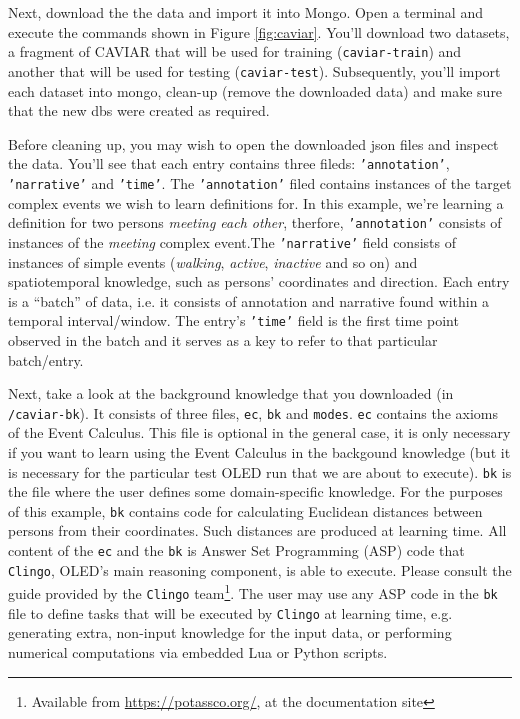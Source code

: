 \documentclass[12pt]{article}
\begin{document}
Next, download the the data and import it into Mongo. Open a terminal and execute the commands shown in Figure \ref{fig:caviar}. You'll download two datasets, a fragment of CAVIAR that will be used for training (\texttt{caviar-train}) and another that will be used for testing (\texttt{caviar-test}). Subsequently, you'll import each dataset into mongo, clean-up (remove the downloaded data) and make sure that the new dbs were created as required. 

Before cleaning up, you may wish to open the downloaded json files and inspect the data. You'll see that each entry contains three fileds: \texttt{'annotation'}, \texttt{'narrative'} and \texttt{'time'}. The \texttt{'annotation'} filed contains instances of the target complex events we wish to learn definitions for. In this example, we're learning a definition for two persons \emph{meeting each other}, therfore, \texttt{'annotation'} consists of instances of the \emph{meeting} complex event.\linebreak The \texttt{'narrative'} field consists of instances of simple events (\emph{walking}, \emph{active}, \emph{inactive} and so on) and spatiotemporal knowledge, such as persons' coordinates and direction. Each entry is a ``batch'' of data, i.e. it consists of annotation and narrative found within a temporal interval/window. The entry's \texttt{'time'} field is the first time point observed in the batch and it serves as a key to refer to that particular batch/entry.     

Next, take a look at the background knowledge that you downloaded \linebreak (in \texttt{/caviar-bk}). It consists of three files, \texttt{ec}, \texttt{bk} and \texttt{modes}. \texttt{ec} contains the axioms of the Event Calculus. This file is optional in the general case, it is only necessary if you want to learn using the Event Calculus in the backgound knowledge (but it is necessary for the particular test OLED run that we are about to execute). \texttt{bk} is the file where the user defines some domain-specific knowledge. For the purposes of this example, \texttt{bk} contains code for calculating Euclidean distances between persons from their coordinates. Such distances are produced at learning time. All content of the \texttt{ec} and the \texttt{bk} is Answer Set Programming (ASP) code that \texttt{Clingo}, OLED's main reasoning component, is able to execute. Please consult the guide provided by the \texttt{Clingo} team\footnote{Available from \url{https://potassco.org/}, at the documentation site}. The user may use any ASP code in the \texttt{bk} file to define tasks that will be executed by \texttt{Clingo} at learning time, e.g. generating extra, non-input knowledge for the input data, or performing numerical computations via embedded Lua or Python scripts. 
\end{document}
